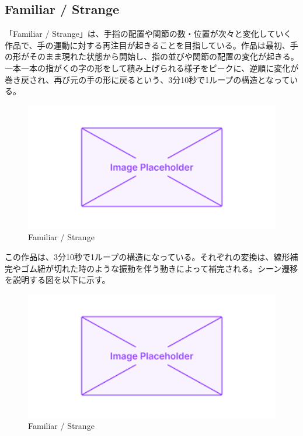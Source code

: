 \subsection*{Familiar / Strange}
「Familiar / Strange」は、手指の配置や関節の数・位置が次々と変化していく作品で、手の運動に対する再注目が起きることを目指している。作品は最初、手の形がそのまま現れた状態から開始し、指の並びや関節の配置の変化が起きる。一本一本の指がくの字の形をして積み上げられる様子をピークに、逆順に変化が巻き戻され、再び元の手の形に戻るという、3分10秒で1ループの構造となっている。
\begin{figure}[H]
  \centering
  \includegraphics[width=15cm]{img/placeholder.png}
  \caption{Familiar / Strange}
  \label{fig:familiar_strange}
\end{figure}

この作品は、3分10秒で1ループの構造になっている。それぞれの変換は、線形補完やゴム紐が切れた時のような振動を伴う動きによって補完される。シーン遷移を説明する図を以下に示す。
\begin{figure}[H]
  \centering
  \includegraphics[width=15cm]{img/placeholder.png}
  \caption{Familiar / Strange}
  \label{fig:diagram_familiar_strange}
\end{figure}

